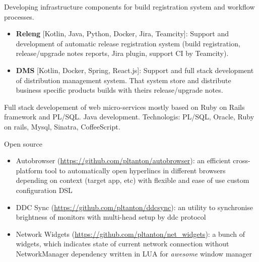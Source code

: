 \documentclass{cv}
\begin{document}
\begin{cvblock}{%
		}

	Developing infrastructure components for build registration
	system and workflow processes.

	\begin{itemize}
		\item \textbf{Releng} [Kotlin, Java, Python, Docker, Jira, Teamcity]: Support and development of automatic release registration system
		      (build registration, release/upgrade notes reports, Jira plugin,
		      support CI by Teamcity).
		\item \textbf{DMS} [Kotlin, Docker, Spring, React.js]: Support and full stack development of distribution management system. That system store and distribute
		      business specific products builds with theirs release/upgrade notes.
	\end{itemize}
\end{cvblock}

\begin{cvblock}{%
		}

	Full stack developement of web micro-services mostly based on Ruby on Rails framework and PL/SQL\@.
	Java development. Technologis: PL/SQL, Oracle, Ruby on rails, Mysql, Sinatra, CoffeeScript.
\end{cvblock}

\begin{cvblock}{Open source}
	\begin{itemize}
		\item Autobrowser
		      (\url{https://github.com/pltanton/autobrowser}):
		      an efficient cross-platform tool to automatically open hyperlincs in different
		      browsers depending on context (target app, etc) with flexible and ease of use custom
		      configuration DSL
		\item DDC Sync
		      (\url{https://github.com/pltanton/ddcsync}):
		      an utility to synchronise brightness of monitors with multi-head setup by ddc protocol
		\item Network Widgets
		      (\url{https://github.com/pltanton/net_widgets}):
		      a bunch of widgets, which indicates state of current network connection
		      without NetworkManager dependency written in LUA for
		      \textit{awesome} window manager
	\end{itemize}
\end{cvblock}
\end{document}
